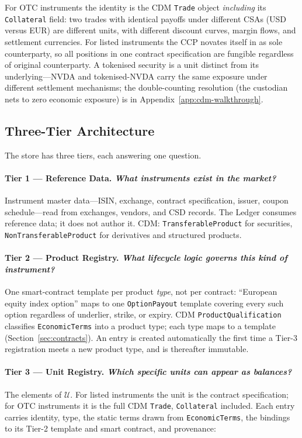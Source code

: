 \documentclass[11pt,a4paper]{article}
\begin{document}
For OTC instruments the identity is the CDM \texttt{Trade} object \emph{including} its \texttt{Collateral} field: two trades with identical payoffs under different CSAs (USD versus EUR) are different units, with different discount curves, margin flows, and settlement currencies. For listed instruments the CCP novates itself in as sole counterparty, so all positions in one contract specification are fungible regardless of original counterparty. A tokenised security is a unit distinct from its underlying---NVDA and tokenised-NVDA carry the same exposure under different settlement mechanisms; the double-counting resolution (the custodian nets to zero economic exposure) is in Appendix~\ref{app:cdm-walkthrough}.

\subsection{Three-Tier Architecture}

The store has three tiers, each answering one question.

\paragraph{Tier 1 --- Reference Data. \emph{What instruments exist in the market?}}
Instrument master data---ISIN, exchange, contract specification, issuer, coupon schedule---read from exchanges, vendors, and CSD records. The Ledger consumes reference data; it does not author it. CDM: \texttt{TransferableProduct} for securities, \texttt{NonTransferableProduct} for derivatives and structured products.

\paragraph{Tier 2 --- Product Registry. \emph{What lifecycle logic governs this kind of instrument?}}
One smart-contract template per product \emph{type}, not per contract: ``European equity index option'' maps to one \texttt{OptionPayout} template covering every such option regardless of underlier, strike, or expiry. CDM \texttt{ProductQualification} classifies \texttt{EconomicTerms} into a product type; each type maps to a template (Section~\ref{sec:contracts}). An entry is created automatically the first time a Tier-3 registration meets a new product type, and is thereafter immutable.

\paragraph{Tier 3 --- Unit Registry. \emph{Which specific units can appear as balances?}}
The elements of $\mathcal{U}$. For listed instruments the unit is the contract specification; for OTC instruments it is the full CDM \texttt{Trade}, \texttt{Collateral} included. Each entry carries identity, type, the static terms drawn from \texttt{EconomicTerms}, the bindings to its Tier-2 template and smart contract, and provenance:
\end{document}

